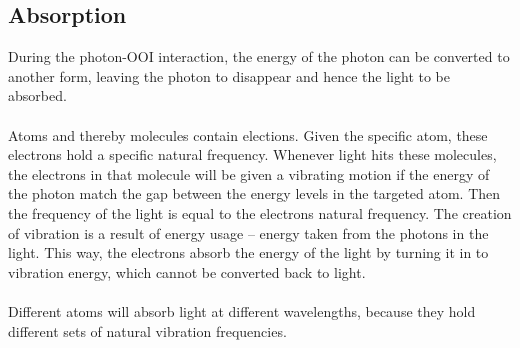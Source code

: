 \subsection{Absorption} \label{sec:abs}
During the photon-OOI interaction, the energy of the photon can be converted to another form, leaving the photon to disappear and hence the light to be absorbed. 
\\\\
Atoms and thereby molecules contain elections. Given the specific atom, these electrons hold a specific natural frequency. Whenever light hits these molecules, the electrons in that molecule will be given a vibrating motion if the energy of the photon match the gap between the energy levels in the targeted atom. Then the frequency of the light is equal to the electrons natural frequency. The creation of vibration is a result of energy usage – energy taken from the photons in the light. This way, the electrons absorb the energy of the light by turning it in to vibration energy, which cannot be converted back to light. \cite{the_physics_classroom_2018}
\\\\
Different atoms will absorb light at different wavelengths, because they hold different sets of natural vibration frequencies. 


